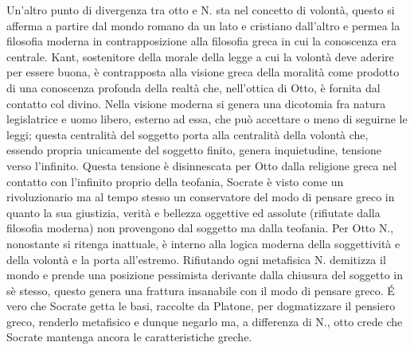 \documentclass[10pt,a4paper]{article}
\begin{document}
Un'altro punto di divergenza tra otto e N. sta nel concetto di volontà, questo si afferma a partire dal mondo romano da un lato e cristiano dall'altro e permea la filosofia moderna in contrapposizione alla filosofia greca in cui la conoscenza era centrale. Kant, sostenitore della morale della legge a cui la volontà deve aderire per essere buona, è contrapposta alla visione greca della moralità come prodotto di una conoscenza profonda della realtà che, nell'ottica di Otto, è fornita dal contatto col divino. Nella visione moderna si genera una dicotomia fra natura legislatrice e uomo libero, esterno ad essa, che può accettare o meno di seguirne le leggi; questa centralità del soggetto porta alla centralità della volontà che, essendo propria unicamente del soggetto finito, genera inquietudine, tensione verso l'infinito. Questa tensione è disinnescata per Otto dalla religione greca nel contatto con l'infinito proprio della teofania, Socrate è visto come un rivoluzionario ma al tempo stesso un conservatore del modo di pensare greco in quanto la sua giustizia, verità e bellezza oggettive ed assolute (rifiutate dalla filosofia moderna) non provengono dal soggetto ma dalla teofania. Per Otto N., nonostante si ritenga inattuale, è interno alla logica moderna della soggettività e della volontà e la porta all'estremo. Rifiutando ogni metafisica N. demitizza il mondo e prende una posizione pessimista derivante dalla chiusura del soggetto in sè stesso, questo genera una frattura insanabile con il modo di pensare greco. \'E vero che Socrate getta le basi, raccolte da Platone, per dogmatizzare il pensiero greco, renderlo metafisico e dunque negarlo ma, a differenza di N., otto crede che Socrate mantenga ancora le caratteristiche greche. 
\newpage
\end{document}

